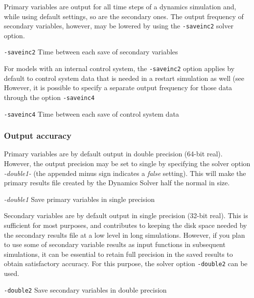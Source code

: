 Primary variables are output for all time steps of a dynamics simulation and,
while using default settings, so are the secondary ones. The output frequency
of secondary variables, however, may be lowered by using the {\tt-saveinc2}
solver option.

{\tt-saveinc2} \hskip1cm Time between each save of secondary variables

For models with an internal control system, the {\tt-saveinc2} option applies by
default to control system data that is needed in a restart simulation as well
(see 
However, it is possible to specify a separate output frequency for those data
through the option {\tt-saveinc4}

{\tt-saveinc4} \hskip1cm Time between each save of control system data

\subsubsection{Output accuracy}

Primary variables are by default output in double precision (64-bit real).
However, the output precision may be set to single by specifying the solver
option {\sl-double1-} (the appended minus sign indicates a {\sl false} setting).
This will make the primary results file created by the Dynamics Solver half the
normal in size.

{\sl -double1} \hskip1cm Save primary variables in single precision


Secondary variables are by default output in single precision (32-bit real).
This is sufficient for most purposes, and contributes to keeping the disk space
needed by the secondary results file at a low level in long simulations.
However, if you plan to use some of secondary variable results as input
functions in subsequent simulations, it can be essential to retain full
precision in the saved results to obtain satisfactory accuracy.
For this purpose, the solver option {\tt-double2} can be used.

{\tt-double2} \hskip1cm Save secondary variables in double precision

